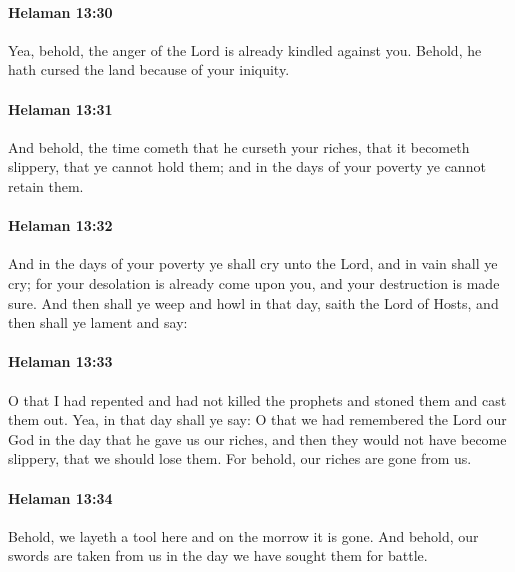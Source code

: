 		\paragraph{Helaman 13:30} %
			\label{HELAMAN-13-30}

			Yea, behold, the anger of the Lord is already kindled against you.
			Behold, he hath cursed the land because of your iniquity.

		\paragraph{Helaman 13:31} %
			\label{HELAMAN-13-31}

			And behold, the time cometh that he curseth your riches,
			that it becometh slippery, that ye cannot hold them;
			and in the days of your poverty ye cannot retain them.

		\paragraph{Helaman 13:32} %
			\label{HELAMAN-13-32}

			And in the days of your poverty ye shall cry unto the Lord,
			and in vain shall ye cry;
			for your desolation is already come upon you,
			and your destruction is made sure.
			And then shall ye weep and howl in that day, saith the Lord of Hosts,
			and then shall ye lament and say:

		\paragraph{Helaman 13:33} %
			\label{HELAMAN-13-33}

			O that I had repented
			and had not killed the prophets and stoned them and cast them out.
			Yea, in that day shall ye say:
			O that we had remembered the Lord our God
			in the day that he gave us our riches,
			and then they would not have become slippery,
			that we should lose them.
			For behold, our riches are gone from us.

		\paragraph{Helaman 13:34} %
			\label{HELAMAN-13-34}

			Behold, we layeth a tool here and on the morrow it is gone.
			And behold, our swords are taken from us
			in the day we have sought them for battle.

